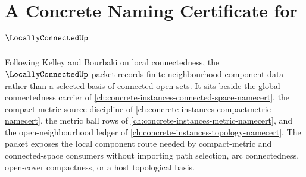 \chapter{A Concrete Naming Certificate for $\LocallyConnectedUp$}
\label{ch:concrete-instances-locally-connected-namecert}

Following Kelley and Bourbaki on local connectedness, the $\LocallyConnectedUp$ packet records finite neighbourhood-component data rather than a selected basis of connected open sets. It sits beside the global connectedness carrier of \autoref{ch:concrete-instances-connected-space-namecert}, the compact metric source discipline of \autoref{ch:concrete-instances-compactmetric-namecert}, the metric ball rows of \autoref{ch:concrete-instances-metric-namecert}, and the open-neighbourhood ledger of \autoref{ch:concrete-instances-topology-namecert}. The packet exposes the local component route needed by compact-metric and connected-space consumers without importing path selection, arc connectedness, open-cover compactness, or a host topological basis.

